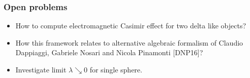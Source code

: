 \documentclass[10pt,t]{beamer}  %
\begin{document}
\begin{frame}
  \frametitle{Open problems}


  \begin{itemize}
  \item How to compute electromagnetic Casimir effect for two delta
    like objects?

  \item How this framework relates to alternative algebraic formalism
    of Claudio Dappiaggi, Gabriele Nosari and Nicola Pinamonti
    [DNP16]?

  \item Investigate limit $\lambda \searrow 0$ for single sphere.
  \end{itemize}

\end{frame}





\appendix





\end{document}

